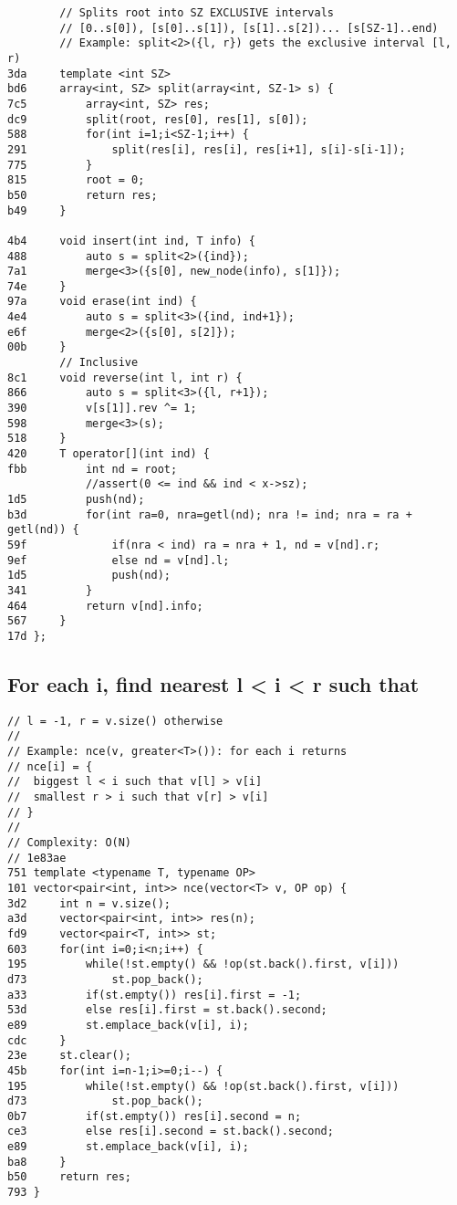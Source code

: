 \documentclass[11pt, a4paper, twoside]{article}
\begin{document}
\begin{lstlisting}
    	// Splits root into SZ EXCLUSIVE intervals
    	// [0..s[0]), [s[0]..s[1]), [s[1]..s[2])... [s[SZ-1]..end)
    	// Example: split<2>({l, r}) gets the exclusive interval [l, r)
3da 	template <int SZ>
bd6 	array<int, SZ> split(array<int, SZ-1> s) {
7c5 		array<int, SZ> res;
dc9 		split(root, res[0], res[1], s[0]);
588 		for(int i=1;i<SZ-1;i++) {
291 			split(res[i], res[i], res[i+1], s[i]-s[i-1]);
775 		}
815 		root = 0;
b50 		return res;
b49 	}
    
4b4 	void insert(int ind, T info) {
488 		auto s = split<2>({ind});
7a1 		merge<3>({s[0], new_node(info), s[1]});
74e 	}
97a 	void erase(int ind) {
4e4 		auto s = split<3>({ind, ind+1});
e6f 		merge<2>({s[0], s[2]});
00b 	}
    	// Inclusive
8c1 	void reverse(int l, int r) {
866 		auto s = split<3>({l, r+1});
390 		v[s[1]].rev ^= 1;
598 		merge<3>(s);
518 	}
420 	T operator[](int ind) {
fbb 		int nd = root;
    		//assert(0 <= ind && ind < x->sz);
1d5 		push(nd);
b3d 		for(int ra=0, nra=getl(nd); nra != ind; nra = ra + getl(nd)) {
59f 			if(nra < ind) ra = nra + 1, nd = v[nd].r;
9ef 			else nd = v[nd].l;
1d5 			push(nd);
341 		}
464 		return v[nd].info;
567 	}
17d };
\end{lstlisting}

\subsection{For each i, find nearest l < i < r such that }
\begin{lstlisting}
// l = -1, r = v.size() otherwise
//
// Example: nce(v, greater<T>()): for each i returns
// nce[i] = {
//  biggest l < i such that v[l] > v[i]
//  smallest r > i such that v[r] > v[i]
// }
//
// Complexity: O(N)
// 1e83ae
751 template <typename T, typename OP>
101 vector<pair<int, int>> nce(vector<T> v, OP op) {
3d2 	int n = v.size();
a3d 	vector<pair<int, int>> res(n);
fd9 	vector<pair<T, int>> st;
603 	for(int i=0;i<n;i++) {
195 		while(!st.empty() && !op(st.back().first, v[i])) 
d73 			st.pop_back();
a33 		if(st.empty()) res[i].first = -1;
53d 		else res[i].first = st.back().second;
e89 		st.emplace_back(v[i], i);
cdc 	}
23e 	st.clear();
45b 	for(int i=n-1;i>=0;i--) {
195 		while(!st.empty() && !op(st.back().first, v[i])) 
d73 			st.pop_back();
0b7 		if(st.empty()) res[i].second = n;
ce3 		else res[i].second = st.back().second;
e89 		st.emplace_back(v[i], i);
ba8 	}
b50 	return res;
793 }
\end{lstlisting}
\end{document}
